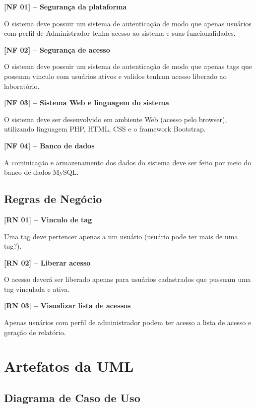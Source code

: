     \noindent
    \textbf{[NF 01] – Segurança da plataforma}
    
        O sistema deve possuir um sistema de autenticação de modo que apenas usuários com perfil de Administrador tenha acesso ao sistema e suas funcionalidades.
    
    \noindent
    \textbf{[NF 02] – Segurança de acesso}
    
        O sistema deve possuir um sistema de autenticação de modo que apenas tags que possuam vinculo com usuários ativos e validos tenham acesso liberado ao laboratório. 
    
    \noindent
    \textbf{[NF 03] – Sistema Web e linguagem do sistema}
    
        O sistema deve ser desenvolvido em ambiente Web (acesso pelo browser), utilizando linguagem PHP, HTML, CSS e o framework Bootstrap.
    
    \noindent
    \textbf{[NF 04] – Banco de dados}
    
        A cominicação e armazenamento dos dados do sistema deve ser feito por meio do banco de dados MySQL.
        
    

    \subsection{Regras de Negócio}

    \noindent
    \textbf{[RN 01] – Vinculo de tag}
    
        Uma tag deve pertencer apenas a um usuário (usuário pode ter mais de uma tag?).
    
    \noindent  
    \textbf{[RN 02] – Liberar acesso}
    
        O acesso deverá ser liberado apenas para usuários cadastrados que pussuam uma tag vinculada e ativa.
    
    \noindent   
    \textbf{[RN 03] – Visualizar lista de acessos}

        Apenas usuários com perfil de administrador podem ter acesso a lista de acesso e geração de relatório.
    

\section{Artefatos da UML}
    \subsection{Diagrama de Caso de Uso}
    
